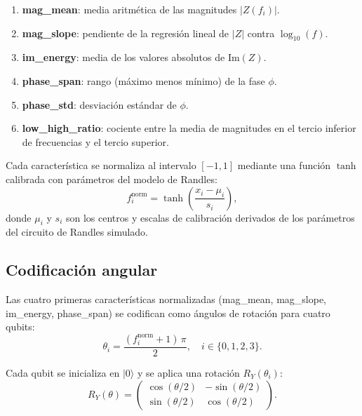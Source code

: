 \documentclass[11pt,a4paper,spanish]{book}
\begin{document}
\begin{enumerate}
	\item \textbf{mag\_mean}: media aritm\'{e}tica de las magnitudes $|Z(f_i)|$.
	\item \textbf{mag\_slope}: pendiente de la regresi\'{o}n lineal de $|Z|$ contra $\log_{10}(f)$.
	\item \textbf{im\_energy}: media de los valores absolutos de $\mathrm{Im}(Z)$.
	\item \textbf{phase\_span}: rango (m\'{a}ximo menos m\'{i}nimo) de la fase $\phi$.
	\item \textbf{phase\_std}: desviaci\'{o}n est\'{a}ndar de $\phi$.
	\item \textbf{low\_high\_ratio}: cociente entre la media de magnitudes en el tercio inferior de frecuencias y el tercio superior.
\end{enumerate}

Cada caracter\'{i}stica se normaliza al intervalo $[-1, 1]$ mediante una funci\'{o}n $\tanh$ calibrada con par\'{a}metros del modelo de Randles:
\begin{equation}
f_i^{\mathrm{norm}} = \tanh\!\left(\frac{x_i - \mu_i}{s_i}\right),
\label{eq:normalizacion}
\end{equation}
donde $\mu_i$ y $s_i$ son los centros y escalas de calibraci\'{o}n derivados de los par\'{a}metros del circuito de Randles simulado.

\subsection{Codificaci\'{o}n angular}

Las cuatro primeras caracter\'{i}sticas normalizadas (mag\_mean, mag\_slope, im\_energy, phase\_span) se codifican como \'{a}ngulos de rotaci\'{o}n para cuatro qubits:
\begin{equation}
\theta_i = \frac{(f_i^{\mathrm{norm}} + 1)\,\pi}{2}, \quad i \in \{0,1,2,3\}.
\label{eq:codificacion-angular}
\end{equation}

Cada qubit se inicializa en $|0\rangle$ y se aplica una rotaci\'{o}n $R_Y(\theta_i)$:
\begin{equation}
R_Y(\theta) = \begin{pmatrix} \cos(\theta/2) & -\sin(\theta/2) \\ \sin(\theta/2) & \cos(\theta/2) \end{pmatrix}.
\label{eq:ry-gate}
\end{equation}
\end{document}
